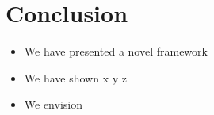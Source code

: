 \chapter{Conclusion}
\label{chapter:conclusion} 

\begin{itemize}

\item{We have presented a novel framework}

\item{We have shown x y z}

\item{We envision}

\end{itemize}


